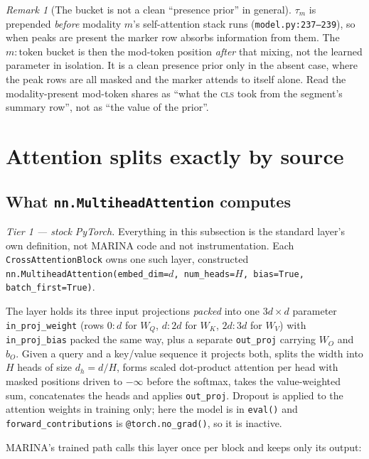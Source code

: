 \documentclass[11pt]{article}
\theoremstyle{plain}
\theoremstyle{remark}
\newtheorem*{remark}{Remark}
\newcommand{\code}[1]{\texttt{\small #1}}
\begin{document}
\begin{remark}[The bucket is not a clean ``presence prior'' in general]
$\tau_m$ is prepended \emph{before} modality $m$'s self-attention stack runs
(\code{model.py:237--239}), so when peaks are present the marker row absorbs
information from them. The $m{:}\text{token}$ bucket is then the mod-token
position \emph{after} that mixing, not the learned parameter in isolation. It
is a clean presence prior only in the absent case, where the peak rows are all
masked and the marker attends to itself alone. Read the modality-present
mod-token shares as ``what the \textsc{cls} took from the segment's summary
row'', not as ``the value of the prior''.
\end{remark}

\section{Attention splits exactly by source}
\label{sec:attn}

\subsection{What \texorpdfstring{\code{nn.MultiheadAttention}}{nn.MultiheadAttention} computes}
\label{sec:mha}

\emph{Tier 1 --- stock PyTorch.} Everything in this subsection is the standard
layer's own definition, not MARINA code and not instrumentation. Each
\code{CrossAttentionBlock} owns one such layer, constructed
\code{nn.MultiheadAttention(embed\_dim=$d$, num\_heads=$H$, bias=True,
batch\_first=True)}.

The layer holds its three input projections \emph{packed} into one
$3d \times d$ parameter \code{in\_proj\_weight} (rows $0{:}d$ for $W_Q$,
$d{:}2d$ for $W_K$, $2d{:}3d$ for $W_V$) with \code{in\_proj\_bias} packed the
same way, plus a separate \code{out\_proj} carrying $W_O$ and $b_O$. Given a
query and a key/value sequence it projects both, splits the width into $H$
heads of size $d_h = d/H$, forms scaled dot-product attention per head with
masked positions driven to $-\infty$ before the softmax, takes the
value-weighted sum, concatenates the heads and applies \code{out\_proj}.
Dropout is applied to the attention weights in training only; here the model is
in \code{eval()} and \code{forward\_contributions} is
\code{@torch.no\_grad()}, so it is inactive.

MARINA's trained path calls this layer once per block and keeps only its
output:
\end{document}
